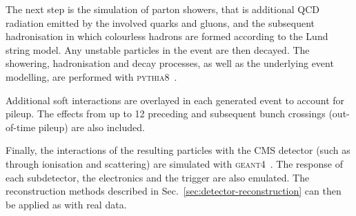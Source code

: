 The next step is the simulation of parton showers, that is additional QCD 
radiation emitted by the involved quarks and gluons, and the subsequent 
hadronisation in which colourless hadrons are formed according to the Lund 
string model. Any unstable particles in the event are then decayed. The 
showering, hadronisation and decay processes, as well as the underlying event 
modelling, are performed with \textsc{pythia8}~\cite{pythia}.


Additional soft interactions are overlayed in each generated event to account 
for pileup. The effects from up to 12 preceding and subsequent bunch crossings 
(out-of-time pileup) are also included.

Finally, the interactions of the resulting particles with the CMS detector 
(such as through ionisation and scattering) are simulated with 
\textsc{geant4}~\cite{geant}. The response of each subdetector, the electronics 
and the trigger are also emulated. The reconstruction methods described in 
Sec.~\ref{sec:detector-reconstruction} can then be applied as with real data.

